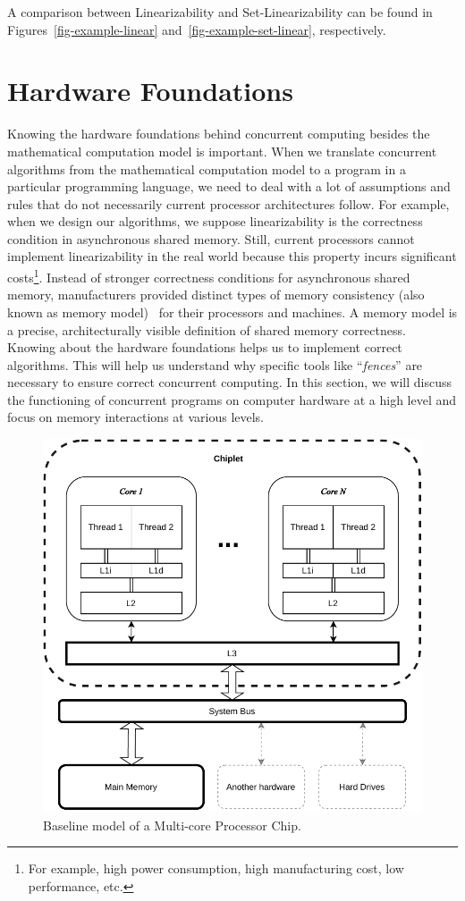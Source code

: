 A comparison between Linearizability and Set-Linearizability can be found in Figures~\ref{fig-example-linear} and~\ref{fig-example-set-linear}, respectively.

\section{\label{sec:hardware-foundations}Hardware Foundations}

Knowing the hardware foundations behind concurrent computing besides the mathematical computation model is important. When we translate concurrent algorithms from the mathematical computation model to a program in a particular programming language, we need to deal with a lot of assumptions and rules that do not necessarily current processor architectures follow. For example, when we design our algorithms, we suppose linearizability is the correctness condition in asynchronous shared memory. Still, current processors cannot implement linearizability in the real world because this property incurs significant costs\footnote{For example, high power consumption, high manufacturing cost, low performance, etc.}. Instead of stronger correctness conditions for asynchronous shared memory, manufacturers provided distinct types of memory consistency (also known as memory model)~\cite{DBLP_series_synthesis_2020Nagarajan, DBLP_series_synthesis_2013Scott} for their processors and machines. A memory model is a precise, architecturally visible definition of shared memory correctness. Knowing about the hardware foundations helps us to implement correct algorithms. This will help us understand why specific tools like ``\emph{fences}'' are necessary to ensure correct concurrent computing. In this section, we will discuss the functioning of concurrent programs on computer hardware at a high level and focus on memory interactions at various levels.

\begin{figure}[ht!]
    \centering
    \includegraphics[width=0.7\linewidth]{contents//figures/III_2_cpu.pdf}
    \caption{Baseline model of a Multi-core Processor Chip.}
    \label{fig:multi-core-processor}
\end{figure}

